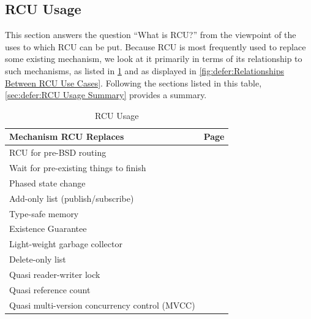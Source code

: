 
\subsection{RCU Usage}
\label{sec:defer:RCU Usage}

This section answers the question ``What is RCU?'' from the viewpoint
of the uses to which RCU can be put.
Because RCU is most frequently used to replace some existing mechanism,
we look at it primarily in terms of its relationship to such mechanisms,
as listed in \cref{tab:defer:RCU Usage}
and as displayed in \cref{fig:defer:Relationships Between RCU Use Cases}.
Following the sections listed in this table,
\cref{sec:defer:RCU Usage Summary} provides a summary.

\begin{table}
\renewcommand*{\arraystretch}{1.2}
\centering
\small
\begin{tabular}{ll}
\toprule
Mechanism RCU Replaces & Page \\
\midrule
RCU for pre-BSD routing &
	\pageref{sec:defer:RCU for Pre-BSD Routing} \\
Wait for pre-existing things to finish &
	\pageref{sec:defer:Wait for Pre-Existing Things to Finish} \\
Phased state change &
	\pageref{sec:defer:Phased State Change} \\
Add-only list (publish/subscribe) &
	\pageref{sec:defer:Add-Only List} \\
Type-safe memory &
	\pageref{sec:defer:Type-Safe Memory} \\
Existence Guarantee &
	\pageref{sec:defer:Existence Guarantee} \\
Light-weight garbage collector &
	\pageref{sec:defer:Light-Weight Garbage Collector} \\
Delete-only list &
	\pageref{sec:defer:Delete-Only List} \\
Quasi reader-writer lock &
	\pageref{sec:defer:Quasi Reader-Writer Lock} \\
Quasi reference count &
	\pageref{sec:defer:Quasi Reference Count} \\
Quasi multi-version concurrency control (MVCC) &
	\pageref{sec:defer:Quasi Multi-Version Concurrency Control} \\
\bottomrule
\end{tabular}
\caption{RCU Usage}
\label{tab:defer:RCU Usage}
\end{table}

